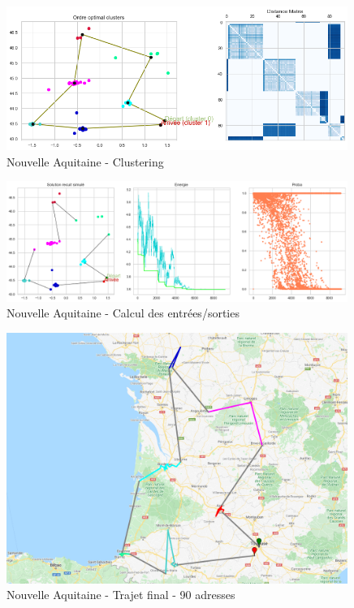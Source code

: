 \documentclass[12pt]{article}
\begin{document}
\begin{figure}[H]
\caption{Nouvelle Aquitaine - Clustering}
\begin{center}
\includegraphics[width=0.99\textwidth]{NA_ordre_cluster_distance_matrix}
\end{center}
\end{figure}


\begin{figure}[H]
\caption{Nouvelle Aquitaine - Calcul des entrées/sorties}
\begin{center}
\includegraphics[width=0.99\textwidth]{NA_entrees_sorties}
\end{center}
\end{figure}

\begin{figure}[H]
\caption{Nouvelle Aquitaine - Trajet final - 90 adresses}
\begin{center}
\includegraphics[width=0.99\textwidth]{NA_trajet_final}
\end{center}
\end{figure}
\end{document}
